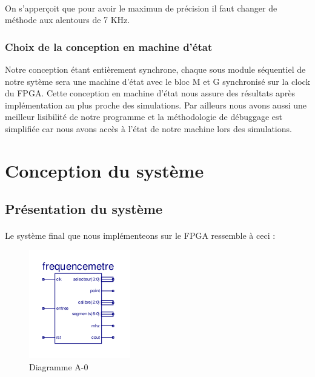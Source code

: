 \documentclass[a4paper,11pt]{article}
\begin{document}
\paragraph{}On s'apperçoit que pour avoir le maximun de précision il faut changer de méthode aux alentours de 7 KHz. 

\subsubsection{Choix de la conception en machine d'état}
Notre conception étant entièrement synchrone, chaque sous module séquentiel de notre sytème sera une machine d'état avec le 
bloc M et G synchronisé sur la clock du FPGA.
Cette conception en machine d'état nous assure des résultats après implémentation au plus proche des simulations.
Par ailleurs nous avons aussi une meilleur lisibilité de notre programme et la méthodologie de débuggage est simplifiée 
car nous avons accès à l'état de notre machine lors des simulations.


\newpage


\section{Conception du système}

\subsection{Présentation du système}

  \paragraph{}Le système final que nous implémenteons sur le FPGA ressemble à ceci :

\begin{figure}[H]
\begin{center}
	\includegraphics[scale=1]{sch-freqa0.png}
	\caption{Diagramme A-0}
\end{center}
\end{figure}
\end{document}
